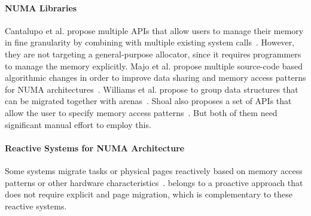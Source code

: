 \paragraph{NUMA Libraries}
Cantalupo et al. propose multiple APIs that allow users to manage their memory in fine granularity by combining with multiple existing system calls~\cite{cantalupo2015memkind}. However, they are not targeting a general-purpose allocator, since it requires programmers to manage the memory explicitly.  Majo et al. propose multiple source-code based  algorithmic changes in order to improve data sharing and memory access patterns for NUMA architectures~\cite{6704666}. Williams et al. propose to group data structures that can be migrated together with arenas~\cite{WilliamsI0L18}. 
Shoal also proposes a set of APIs that allow the user to specify memory access patterns~\cite{Kaestle:2015:SSA:2813767.2813787}. 
But both of them need significant manual effort to employ this. 

\paragraph{Reactive Systems for NUMA Architecture} Some systems migrate tasks or physical pages reactively based on memory access patterns or other hardware characteristics~\cite{simplenuma, Blagodurov:2011:CNC:2002181.2002182, AutoNUMA, Dashti:2013:TMH:2451116.2451157, Lepers:2015:TMP:2813767.2813788}. 
\NM{} belongs to a proactive approach that does not require explicit and page migration, which is complementary to these reactive systems. 

